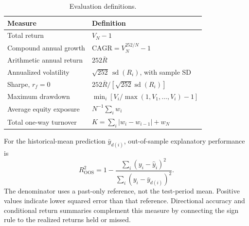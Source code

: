\begin{table}[!htbp]
\centering\small
\caption{Evaluation definitions.}
\label{tab:metrics}
\begin{tabularx}{\textwidth}{@{}p{}X@{}}
\toprule
Measure & Definition \\
\midrule
Total return & $V_N-1$ \\
Compound annual growth & $\mathrm{CAGR}=V_N^{252/N}-1$ \\
Arithmetic annual return & $252\overline R$ \\
Annualized volatility & $\sqrt{252}\,\operatorname{sd}(R_i)$, with sample SD \\
Sharpe, $r_f=0$ & $252\overline R/[\sqrt{252}\operatorname{sd}(R_i)]$ \\
Maximum drawdown & $\min_i[V_i/\max(1,V_1,\ldots,V_i)-1]$ \\
Average equity exposure & $N^{-1}\sum_iw_i$ \\
Total one-way turnover & $K=\sum_i|w_i-w_{i-1}|+w_N$ \\
\bottomrule
\end{tabularx}
\end{table}

For the historical-mean prediction $\bar y_{d(i)}$, out-of-sample explanatory performance is
\begin{equation}
R^2_{\mathrm{OOS}}=1-
\frac{\sum_i(y_i-\widehat y_i)^2}
{\sum_i(y_i-\bar y_{d(i)})^2}.
\label{eq:r2}
\end{equation}
The denominator uses a past-only reference, not the test-period mean. Positive values indicate lower squared error than that reference. Directional accuracy and conditional return summaries complement this measure by connecting the sign rule to the realized returns held or missed.
